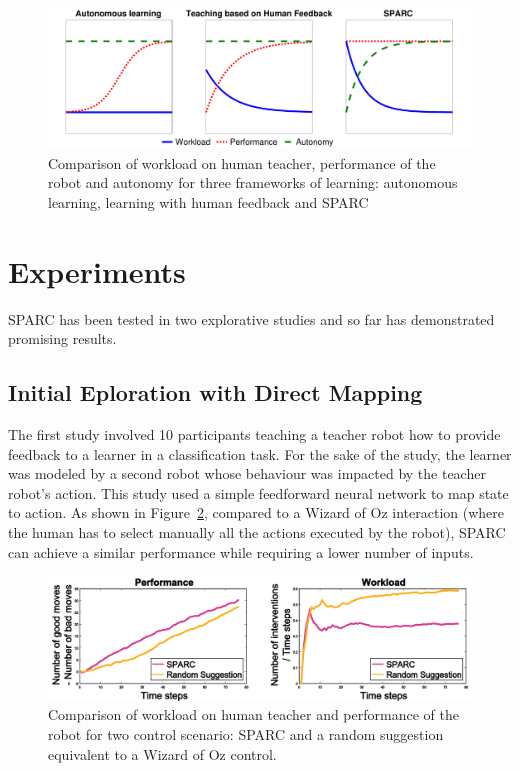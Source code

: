 \documentclass[conference]{IEEEtran}
\begin{document}
\begin{figure}
    \centering
    \includegraphics[width=0.9\linewidth]{motivation.pdf}
    \caption{Comparison of workload on human teacher, performance of the robot
    and autonomy for three frameworks of learning: autonomous learning, learning
    with human feedback and SPARC}
    \label{fig:comparison}
\end{figure}

\section{Experiments}

SPARC has been tested in two explorative studies and so far has demonstrated
promising results.

\subsection{Initial Eploration with Direct Mapping}

The first study \cite{senft2015sparc} involved 10 participants teaching a
teacher robot how to provide feedback to a learner in a classification task. For
the sake of the study, the learner was modeled by a second robot whose behaviour
was impacted by the teacher robot's action. This study used a simple feedforward
neural network to map state to action. As shown in Figure~\ref{fig:ICSR},
compared to a Wizard of Oz interaction (where the human has to select manually
all the actions executed by the robot), SPARC can achieve a similar performance
while requiring a lower number of inputs.

\begin{figure}
    \centering
    \includegraphics[width=0.9\linewidth]{ICSR.pdf}
    \caption{Comparison of workload on human teacher and performance of the robot
    for two control scenario: SPARC and a random suggestion equivalent to a
    Wizard of Oz control.}
    \label{fig:ICSR}
\end{figure}
\end{document}
